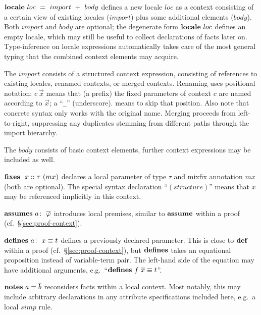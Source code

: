 \begin{descr}
  
\item [${\mathord{\mathbf{locale}}}~loc~=~import~+~body$] defines a new locale $loc$ as a context
  consisting of a certain view of existing locales ($import$) plus some
  additional elements ($body$).  Both $import$ and $body$ are optional; the
  degenerate form ${\mathord{\mathbf{locale}}}~loc$ defines an empty locale, which may still be
  useful to collect declarations of facts later on.  Type-inference on locale
  expressions automatically takes care of the most general typing that the
  combined context elements may acquire.

  The $import$ consists of a structured context expression, consisting of
  references to existing locales, renamed contexts, or merged contexts.
  Renaming uses positional notation: $c~\vec x$ means that (a prefix) the
  fixed parameters of context $c$ are named according to $\vec x$; a
  ``\texttt{_}'' (underscore). means to skip that
  position.  Also note that concrete syntax only works with the original name.
  Merging proceeds from left-to-right, suppressing any duplicates stemming
  from different paths through the import hierarchy.

  The $body$ consists of basic context elements, further context expressions
  may be included as well.

  \begin{descr}

  \item [${\mathord{\mathbf{fixes}}}~~x::\tau~(mx)$] declares a local parameter of type $\tau$
    and mixfix annotation $mx$ (both are optional).  The special syntax
    declaration ``$(structure)$'' means that $x$ may be referenced
    implicitly in this context.

  \item [$\ASSUMES{a}{\vec\phi}$] introduces local premises, similar to
    ${\mathord{\mathbf{assume}}}$ within a proof (cf.\ \S\ref{sec:proof-context}).

  \item [$\DEFINES{a}{x \equiv t}$] defines a previously declared parameter.
    This is close to ${\mathord{\mathbf{def}}}$ within a proof (cf.\
    \S\ref{sec:proof-context}), but ${\mathord{\mathbf{defines}}}$ takes an equational
    proposition instead of variable-term pair.  The left-hand side of the
    equation may have additional arguments, e.g.\ ``$\DEFINES{}{f~\vec x
      \equiv t}$''.

  \item [$\NOTES{a}{\vec b}$] reconsiders facts within a local context.  Most
    notably, this may include arbitrary declarations in any attribute
    specifications included here, e.g.\ a local $simp$ rule.


\end{descr}
\end{descr}
